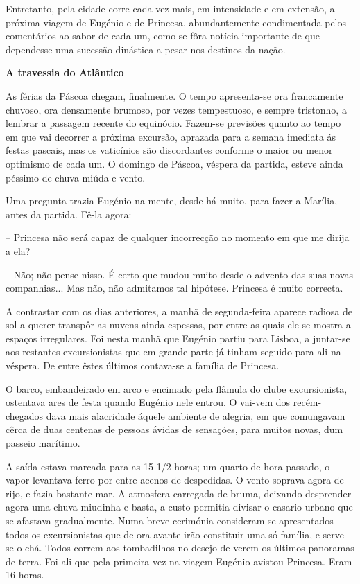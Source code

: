 \documentclass[9pt]{article}
\begin{document}
Entretanto, pela cidade corre cada vez mais, em intensidade e em extensão, a próxima viagem de Eugé\-nio e de Princesa, abundantemente condimentada
pelos comentários ao sabor de cada um, como se fôra notícia importante
de que dependesse uma sucessão dinástica a pesar nos destinos da na\-ção.

\begin{center}\bf\large A travessia do Atlântico\end{center}

As férias da Páscoa chegam, finalmente. O tempo apresenta-se ora francamente chuvoso, ora densamente brumoso, por vezes tempestuoso, e sempre tristonho, a lembrar a passagem recente do equinócio. Fazem-se previsões quanto
ao tempo em que vai decorrer a próxima excursão, aprazada para a semana imediata ás festas pascais, mas os vaticínios são discordantes conforme o maior
ou menor optimismo de cada um. O domingo de Páscoa, véspera da partida, esteve
ainda pés\-simo de chuva miúda e vento.

Uma pregunta trazia Eugé\-nio na mente, desde há muito, para fazer a Marília, antes da partida. Fê-la agora:

-- Princesa não será capaz de qualquer incorrec\-ção no momento em que
me dirija a ela?

-- Não; não pense nisso. É certo que mudou muito desde o advento das
suas novas companhias... Mas não, não admitamos tal hipótese. Princesa é
muito correcta.

A contrastar com os dias anteriores, a manhã de segunda-feira aparece
radiosa de sol a querer transpôr as nuvens ainda espessas, por entre as quais
ele se mostra a espaços irregulares. Foi nesta manhã que Eugé\-nio partiu
para Lisboa, a juntar-se aos restantes excursionistas que em gran\-de parte
já tinham seguido para ali na véspera. De entre êstes últimos contava-se a
fa\-mí\-lia de Princesa.

O barco, embandeirado em arco e encimado pela flâmula do clube excursionista, ostentava ares de festa quan\-do Eugé\-nio nele entrou. O vai-vem dos
recém-chegados dava mais alacridade áquele ambiente de alegria, em que comungavam cêrca de duas centenas de pessoas ávidas de sensa\-ções, para muitos novas, dum passeio marítimo.

A saída estava marcada para as 15 1/2 horas; um quarto de hora passado,
o vapor levantava ferro por entre acenos de despedidas. O vento soprava agora de rijo, e fazia bastante mar. A atmosfera carregada de bruma, deixando desprender agora uma chuva miudinha e basta, a custo permitia divisar o casario
urbano que se afastava gradualmente. Numa breve cerimónia consideram-se apresentados todos os excursionistas que de ora avante irão constituir uma só
fa\-mí\-lia, e ser\-\mbox{ve-se} o chá. Todos correm aos tombadi\-lhos no desejo de verem
os últimos panoramas de terra. Foi ali que pela primeira vez na viagem Eugé\-nio avistou Princesa. Eram 16 horas.
\end{document}
